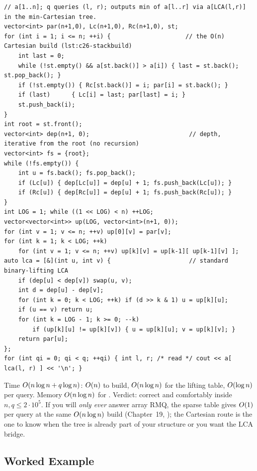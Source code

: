 \begin{lstlisting}[caption={Array RMQ via the Cartesian tree: stack build records parents, binary lifting answers LCA, the query is a[LCA]}, label={lst:c26-rmq}]
// a[1..n]; q queries (l, r); outputs min of a[l..r] via a[LCA(l,r)] in the min-Cartesian tree.
vector<int> par(n+1,0), Lc(n+1,0), Rc(n+1,0), st;
for (int i = 1; i <= n; ++i) {                     // the O(n) Cartesian build (lst:c26-stackbuild)
    int last = 0;
    while (!st.empty() && a[st.back()] > a[i]) { last = st.back(); st.pop_back(); }
    if (!st.empty()) { Rc[st.back()] = i; par[i] = st.back(); }
    if (last)      { Lc[i] = last; par[last] = i; }
    st.push_back(i);
}
int root = st.front();
vector<int> dep(n+1, 0);                            // depth, iterative from the root (no recursion)
vector<int> fs = {root};
while (!fs.empty()) {
    int u = fs.back(); fs.pop_back();
    if (Lc[u]) { dep[Lc[u]] = dep[u] + 1; fs.push_back(Lc[u]); }
    if (Rc[u]) { dep[Rc[u]] = dep[u] + 1; fs.push_back(Rc[u]); }
}
int LOG = 1; while ((1 << LOG) < n) ++LOG;
vector<vector<int>> up(LOG, vector<int>(n+1, 0));
for (int v = 1; v <= n; ++v) up[0][v] = par[v];
for (int k = 1; k < LOG; ++k)
    for (int v = 1; v <= n; ++v) up[k][v] = up[k-1][ up[k-1][v] ];
auto lca = [&](int u, int v) {                      // standard binary-lifting LCA
    if (dep[u] < dep[v]) swap(u, v);
    int d = dep[u] - dep[v];
    for (int k = 0; k < LOG; ++k) if (d >> k & 1) u = up[k][u];
    if (u == v) return u;
    for (int k = LOG - 1; k >= 0; --k)
        if (up[k][u] != up[k][v]) { u = up[k][u]; v = up[k][v]; }
    return par[u];
};
for (int qi = 0; qi < q; ++qi) { int l, r; /* read */ cout << a[ lca(l, r) ] << '\n'; }
\end{lstlisting}
\begin{complexitybox}
Time $O(n\log n + q\log n)$: $O(n)$ to build, $O(n\log n)$ for the lifting table, $O(\log
n)$ per query. Memory $O(n\log n)$ for . Verdict: correct and comfortably inside $n,q\le
2\cdot10^5$. If you will \emph{only ever} answer array RMQ, the sparse table gives $O(1)$ per query at
the same $O(n\log n)$ build (Chapter~19, ); the Cartesian route is the one to know when the
tree is already part of your structure or you want the LCA bridge.
\end{complexitybox}

\subsection{Worked Example}

